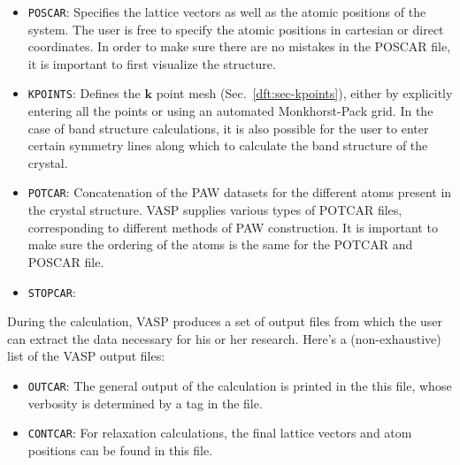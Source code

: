 \begin{refsection}
\begin{itemize}
 \label{appendix:sec-POSCAR} 
\item \texttt{POSCAR}: Specifies the lattice vectors as well as the atomic 
positions of the system. The user is free to specify the atomic positions in 
cartesian or direct coordinates. In order to make sure there are no mistakes 
in the POSCAR file, it is important to first visualize the structure.  
 
 \label{appendix:sec-KPOINTS} 
\item \texttt{KPOINTS}: Defines the $\mathbf{k}$ point mesh 
(Sec.~\ref{dft:sec-kpoints}), either by explicitly entering all the points or 
using an automated Monkhorst-Pack grid. In the case of band structure 
calculations, it is also possible for the user to enter certain symmetry lines 
along which to calculate the band structure of the crystal. 
 
 \label{appendix:sec-POTCAR} 
\item \texttt{POTCAR}: Concatenation of the PAW datasets for the different 
atoms present in the crystal structure. VASP supplies various types of POTCAR 
files, corresponding to different methods of PAW construction. It is important 
to make sure the ordering of the atoms is the same for the POTCAR and POSCAR 
file. 
 
 \label{appendix:sec-STOPCAR} 
\item \texttt{STOPCAR}: 
 
\end{itemize} 
 
 
During the calculation, VASP produces a set of output files from which the 
user can extract the data necessary for his or her research. Here's a 
(non-exhaustive) list of the VASP output files: 
 
\begin{itemize} 
 
 \label{appendix:sec-OUTCAR} 
\item \texttt{OUTCAR}: The general output of the calculation is printed in the 
this file, whose verbosity is determined by a tag in the  file. 
 
 \label{appendix:sec-CONTCAR} 
\item \texttt{CONTCAR}: For relaxation calculations, the final lattice vectors 
and atom positions can be found in this file. 
 
\end{itemize} 
 

\end{refsection}
